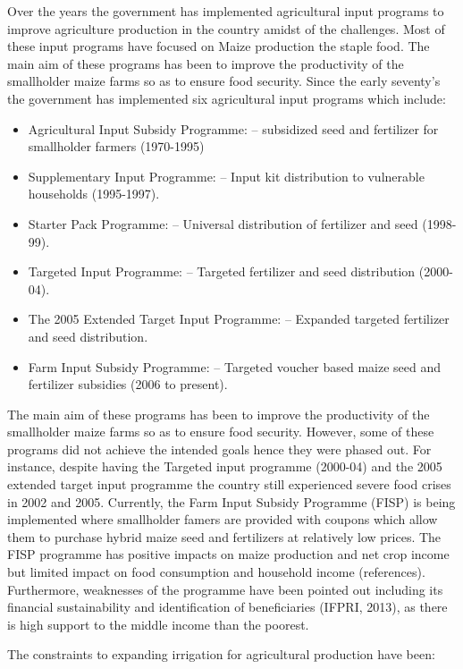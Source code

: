 \documentclass[
]{book}
\providecommand{\tightlist}{%
  \setlength{\itemsep}{0pt}\setlength{\parskip}{0pt}}
\begin{document}
Over the years the government has implemented agricultural input programs to improve agriculture production in the country amidst of the challenges. Most of these input programs have focused on Maize production the staple food. The main aim of these programs has been to improve the productivity of the smallholder maize farms so as to ensure food security. Since the early seventy's the government has implemented six agricultural input programs which include:

\begin{itemize}
\tightlist
\item
  Agricultural Input Subsidy Programme: -- subsidized seed and fertilizer for smallholder farmers (1970-1995)
\item
  Supplementary Input Programme: -- Input kit distribution to vulnerable households (1995-1997).
\item
  Starter Pack Programme: -- Universal distribution of fertilizer and seed (1998-99).
\item
  Targeted Input Programme: -- Targeted fertilizer and seed distribution (2000-04).
\item
  The 2005 Extended Target Input Programme: -- Expanded targeted fertilizer and seed distribution.
\item
  Farm Input Subsidy Programme: -- Targeted voucher based maize seed and fertilizer subsidies (2006 to present).
\end{itemize}

The main aim of these programs has been to improve the productivity of the smallholder maize farms so as to ensure food security. However, some of these programs did not achieve the intended goals hence they were phased out. For instance, despite having the Targeted input programme (2000-04) and the 2005 extended target input programme the country still experienced severe food crises in 2002 and 2005. Currently, the Farm Input Subsidy Programme (FISP) is being implemented where smallholder famers are provided with coupons which allow them to purchase hybrid maize seed and fertilizers at relatively low prices. The FISP programme has positive impacts on maize production and net crop income but limited impact on food consumption and household income (references). Furthermore, weaknesses of the programme have been pointed out including its financial sustainability and identification of beneficiaries (IFPRI, 2013), as there is high support to the middle income than the poorest.

The constraints to expanding irrigation for agricultural production have been:
\end{document}
